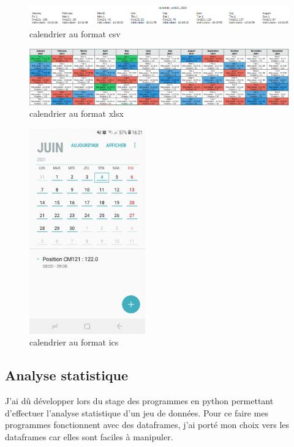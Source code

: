 \documentclass[12pt,a4paper]{article}
\begin{document}
\begin{flushleft}
\begin{figure}[H]
\centering
\includegraphics[width=16cm]{image/calendrier/3.PNG} 
\caption{calendrier au format csv}  
\end{figure}

\begin{figure}[H]
\centering
\includegraphics[width=16cm]{image/calendrier/2.PNG} 
\caption{calendrier au format xlsx}  
\end{figure}

\begin{figure}[H]
\centering
\includegraphics[width=5cm]{image/calendrier/4.jpg} 
\caption{calendrier au format ics}  
\end{figure}

\subsection{Analyse statistique}

J'ai dû développer lors du stage des programmes en python permettant d'effectuer l'analyse statistique d'un jeu de données. Pour ce faire mes programmes fonctionnent avec des dataframes, j'ai porté mon choix vers les dataframes car elles sont faciles à manipuler. 


\end{flushleft}
\end{document}

